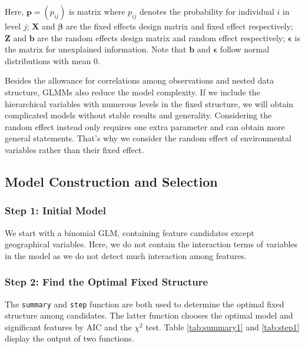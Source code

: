 \documentclass[11pt,twoside]{article}
\numberwithin{Theorem}{section}
\numberwithin{Definition}{section}
\numberwithin{Lemma}{section}
\numberwithin{Algorithm}{section}
\numberwithin{equation}{section}
\begin{document}
Here, $\boldsymbol{p} = (p_{ij})$ is matrix where $p_{ij}$ denotes the probability for individual $i$ in level $j$; $\boldsymbol{X}$ and $\boldsymbol{\beta}$ are the fixed effects design matrix and fixed effect respectively; $\boldsymbol{Z}$ and $\boldsymbol{b}$ are the random effects design matrix and random effect respectively; $\boldsymbol{\epsilon}$ is the matrix for unexplained information. Note that $\boldsymbol{b}$ and $\boldsymbol{\epsilon}$ follow normal distributions with mean 0. 

Besides the allowance for correlations among observations and nested data structure, GLMMs also reduce the model complexity. If we include the hierarchical variables with numerous levels in the fixed structure, we will obtain complicated models without stable results and generality. Considering the random effect instead only requires one extra parameter and can obtain more general statements. That's why we consider the random effect of environmental variables rather than their fixed effect.

\subsection{Model Construction and Selection}

\subsubsection{Step 1: Initial Model}

We start with a binomial GLM, containing feature candidates except geographical variables. Here, we do not contain the interaction terms of variables in the model as we do not detect much interaction among features. 

\subsubsection{Step 2: Find the Optimal Fixed Structure}

The \texttt{summary} and \texttt{step} function are both used to determine the optimal fixed structure among candidates. The latter function chooses the optimal model and significant features by AIC and the $\chi^2$ test. Table \ref{tab:summary1} and \ref{tab:step1} display the output of two functions.
\end{document}
